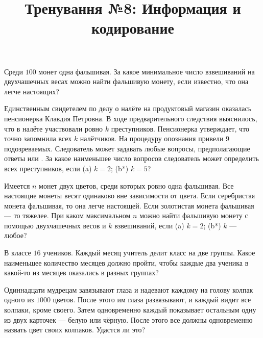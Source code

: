 


\title{Тренування №8: Информация и кодирование}
\maketitle
\begin{problem}
	Среди $100$ монет одна фальшивая. За какое минимальное число взвешиваний на двухчашечных весах можно найти фальшивую монету, если известно, что она легче настоящих?
\end{problem}

\begin{problem}
	Единственным свидетелем по делу о налёте на продуктовый магазин \guillemotright оказалась пенсионерка Клавдия Петровна. В ходе предварительного следствия выяснилось, что в налёте участвовали ровно $k$ преступников. Пенсионерка утверждает, что точно запомнила всех $k$ налётчиков. На процедуру опознания привели $9$ подозреваемых. Следователь может задавать любые вопросы, предполагающие ответы \guillemotright или \guillemotright. За какое наименьшее число вопросов следователь может определить всех преступников, если (a) $k = 2$; (b*) $k = 5$?
\end{problem}

\begin{problem}
	Имеется $n$ монет двух цветов, среди которых ровно одна фальшивая. Все настоящие монеты весят одинаково вне зависимости от цвета. Если серебристая монета фальшивая, то она легче настоящей. Если золотистая монета фальшивая --- то тяжелее. При каком максимальном $n$ можно найти фальшивую монету с помощью двухчашечных весов и $k$ взвешиваний, если (a) $k = 2$; (b*) $k$ --- любое?
\end{problem}

\begin{problem}
	В классе $16$ учеников. Каждый месяц учитель делит класс на две группы. Какое наименьшее количество месяцев должно пройти, чтобы каждые два ученика в какой-то из месяцев оказались в разных группах?
\end{problem}

\begin{problem}
	Одиннадцати мудрецам завязывают глаза и надевают каждому на голову колпак одного из $1000$ цветов. После этого им глаза развязывают, и каждый видит все колпаки, кроме своего. Затем одновременно каждый показывает остальным одну из двух карточек --- белую или чёрную. После  этого все должны одновременно назвать цвет своих колпаков. Удастся ли это?
\end{problem}

